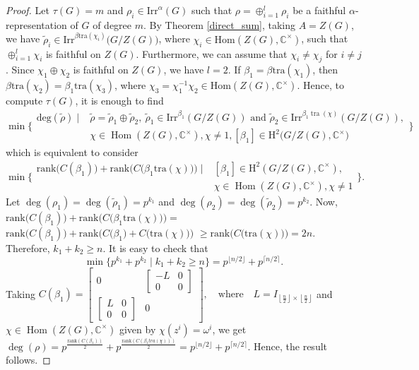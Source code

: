 \documentclass[a4paper,11pt]{amsart}
\numberwithin{equation}{section}
\numberwithin{equation}{subsection}
\newcommand{\C}{\mathbb{C}}
\newcommand{\irr}{\mathrm{Irr}}
\newcommand{\Hom}{\mathrm{Hom}}
\newcommand{\tra}{\operatorname{tra}}
\begin{document}
\begin{proof}
	Let $\tau(G)= m$ and $\rho_i \in \mathrm{Irr}^\alpha(G)$ such that $\rho = \oplus_{i=1}^l\rho_i$ be a faithful $\alpha$-representation of $G$ of degree $m$. By Theorem \ref{direct_sum}, taking $A= Z(G)$, we have $\tilde\rho_i \in \mathrm{Irr}^{\beta\mathrm{tra}(\chi_i)}\big(G/Z(G)\big)$, where $\chi_i \in  \Hom(Z(G), \mathbb{C}^{\times})$, such that $\oplus_{i=1}^l\chi_i$ is faithful on $Z(G)$. 
	Furthermore, we can assume that $\chi_i \neq \chi_j$ for $i \neq j$.
	Since $\chi_1 \oplus \chi_2$ is faithful on $Z(G)$, we have $l=2$. If $\beta_1= \beta\mathrm{tra}(\chi_1)$, then $\beta\mathrm{tra}(\chi_2)= \beta_1\mathrm{tra}(\chi_3)$, where $\chi_3= \chi_1^{-1}\chi_2 \in \mathrm{Hom}(Z(G), \mathbb{C}^{\times})$. Hence, to compute $\tau(G)$, it is enough to find 
	\[\operatorname{min}\Biggl\{
	\begin{array}{cl} \mathrm{deg}(\tilde{\rho}) \mid & \tilde{\rho}= \tilde{\rho}_1 \oplus \tilde{\rho}_2,\ \tilde{\rho}_1 \in \irr^{\beta_1}(G/Z(G)) \text{ and } \tilde{\rho}_2 \in \mathrm{Irr}^{\beta_1\tra(\chi)}(G/Z(G)),\\
		& \chi\in\operatorname{Hom}(Z(G),\mathbb{C}^{\times}), \chi \neq 1,[\beta_1] \in \mathrm{H}^2\big(G/Z(G), \C^{\times}\big)
	\end{array}
	\Bigg\}\]
	which is equivalent to consider
	\[\operatorname{min}\Biggl\{
	\begin{array}{cl}  \text{rank}\big(C(\beta_1)\big)+\text{rank}\Big(C\big(\beta_1\mathrm{tra}(\chi)\big)\Big)\mid & [\beta_1] \in \mathrm{H}^2(G/Z(G), \C^{\times}),\\
		& \chi \in \operatorname{Hom}(Z(G),\mathbb{C}^{\times}), \chi \neq 1 \end{array}
	\Bigg\}.\] 
	Let $\operatorname{deg}(\rho_1)=\operatorname{deg}(\tilde{\rho}_1)= p^{k_1}$ and $\operatorname{deg}(\rho_2)=\operatorname{deg}(\tilde{\rho}_2)=p^{k_2}$.
	Now, $\text{rank} \big(C(\beta_1)\big) +\text{rank} \Big(C\big(\beta_1\mathrm{tra}(\chi)\big)\Big)=$
	$\text{rank}\big(C(\beta_1)\big)+\text{rank}\Big(C\big(\beta_1\big)+C\big(\mathrm{tra}(\chi)\big)\Big)$
	$\geq \text{rank}\Big(C\big(\mathrm{tra}(\chi)\big)\Big)=2n$. Therefore, $k_1+k_2 \geq n$. It is easy to check that 
	$$\operatorname{min}\{p^{k_1}+p^{k_2}\mid k_1+k_2 \geq n\} = p^{\lfloor{n/2}\rfloor} +p^{\lceil{n/2}\rceil}.$$  
	Taking $C(\beta_1)=
	\begin{bmatrix}
		0 & 
		\begin{bmatrix}
			-L & 0 \\[4pt]
			0 & 0
		\end{bmatrix}
		\\[10pt]
		\begin{bmatrix}
			L & 0 \\[4pt]
			0 & 0
		\end{bmatrix}
		& 0
	\end{bmatrix},
	\quad \text{where} \quad L = I_{\left\lfloor \frac{n}{2} \right\rfloor \times \left\lfloor \frac{n}{2} \right\rfloor}$ and $\chi \in  \operatorname{Hom}(Z(G),\mathbb{C}^{\times})$ given by $\chi(z^i)=\omega^{i}$, we get $\operatorname{deg}(\rho) = p^{\frac{\mathrm{rank}(C(\beta_1))}{2}}+p^{\frac{\mathrm{rank}(C(\beta_1 tra(\chi)))}{2}}
	=p^{\lfloor{n/2}\rfloor} + p^{\lceil{n/2}\rceil}$. Hence, the result follows.
	

\end{proof}
\end{document}
